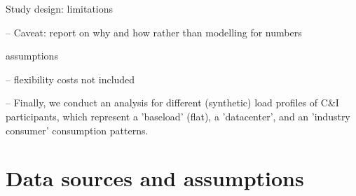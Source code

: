 \begin{frame}{Study design: limitations}
  

  -- Caveat: report on why and how rather than modelling for numbers
  
  assumptions 
  
  -- flexibility costs not included
  
  -- Finally, we conduct an analysis for different (synthetic) load profiles of C\&I participants, which represent a \alert{'baseload'} (flat), a \alert{'datacenter'}, and an \alert{'industry consumer'} consumption patterns.   
  
  \end{frame}


\section{Data sources and assumptions}


